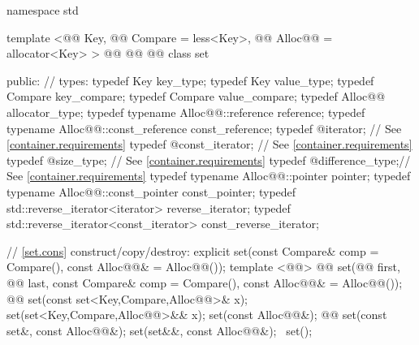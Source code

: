 \documentclass[american,twoside]{book}
\begin{document}
\begin{codeblock}
namespace std {
  template <@@ Key, @@ Compare = less<Key>,
            @@ Alloc@@ = allocator<Key> >
  @@
           @@
           @@
  class set {
  public:
    // types:
    typedef Key                                   key_type;
    typedef Key                                   value_type;
    typedef Compare                               key_compare;
    typedef Compare                               value_compare;
    typedef Alloc@@                             allocator_type;
    typedef typename Alloc@@::reference         reference;
    typedef typename Alloc@@::const_reference   const_reference;
    typedef @\impdef@                iterator;       // See \ref{container.requirements}
    typedef @\impdef@                const_iterator; // See \ref{container.requirements}
    typedef @\impdef@                size_type;      // See \ref{container.requirements}
    typedef @\impdef@                difference_type;// See \ref{container.requirements}
    typedef typename Alloc@@::pointer           pointer;
    typedef typename Alloc@@::const_pointer     const_pointer;
    typedef std::reverse_iterator<iterator>       reverse_iterator;
    typedef std::reverse_iterator<const_iterator> const_reverse_iterator;

    // \ref{set.cons} construct/copy/destroy:
    explicit set(const Compare& comp = Compare(),
                 const Alloc@@& = Alloc@@());
    template <@@>
      @@
      set(@@ first, @@ last,
          const Compare& comp = Compare(), const Alloc@@& = Alloc@@());
    @@ 
      set(const set<Key,Compare,Alloc@@>& x);
    set(set<Key,Compare,Alloc@@>&& x);
    set(const Alloc@@&);
    @@ 
      set(const set&, const Alloc@@&);
    set(set&&, const Alloc@@&);
   ~set();

}}
\end{codeblock}
\end{document}
